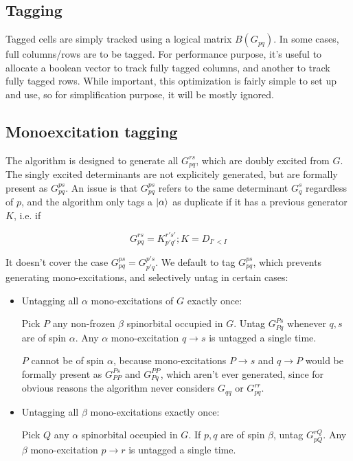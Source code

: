 \documentclass[./thesis.tex]{subfiles}
\begin{document}
\subsection{Tagging}

Tagged cells are simply tracked using a logical matrix $B(G_{pq})$.
In some cases, full columns/rows are to be tagged. For performance purpose, it's useful to allocate a boolean vector to track fully tagged columns, and another to track fully tagged rows. While important, this optimization is fairly simple to set up and use, so for simplification purpose, it will be mostly ignored.


\subsection{Monoexcitation tagging}

The algorithm is designed to generate all $G_{pq}^{rs}$, which are doubly excited from $G$. The singly excited determinants are not explicitely generated, but are formally present as $G_{pq}^{ps}$.
An issue is that $G_{pq}^{ps}$ refers to the same determinant $G_q^s$ regardless of $p$, and the algorithm only tags a $\ket \alpha$ as duplicate if it has a previous generator $K$, i.e. if

\begin{equation}
G_{pq}^{rs} = {K}_{p'q'}^{r's'} ; K = D_{I'<I}
\end{equation}

It doesn't cover the case $G_{pq}^{ps} = G_{p'q}^{p's}$.
We default to tag $G_{pq}^{ps}$, which prevents generating mono-excitations, and selectively untag in certain cases:


\begin{itemize}
\item
Untagging all $\alpha$ mono-excitations of $G$ exactly once:

Pick $P$ any non-frozen $\beta$ spinorbital occupied in $G$. Untag $G_{Pq}^{Ps}$ whenever $q,s$ are of spin $\alpha$. Any $\alpha$ mono-excitation $q \rightarrow  s$ is untagged a single time.

$P$ cannot be of spin $\alpha$, because mono-excitations $P \rightarrow  s$ and $q \rightarrow  P$ would be formally present as $G_{PP}^{Ps}$ and $G_{Pq}^{PP}$, which aren't ever generated, since for obvious reasons the algorithm never considers $G_{qq}$ or $G_{pq}^{rr}$.
\item
Untagging all $\beta$ mono-excitations exactly once:

Pick $Q$ any $\alpha$ spinorbital occupied in $G$. If $p,q$ are of spin $\beta$, untag $G_{pQ}^{rQ}$. Any $\beta$ mono-excitation $p \rightarrow  r$ is untagged a single time.
\end{itemize}
\end{document}
